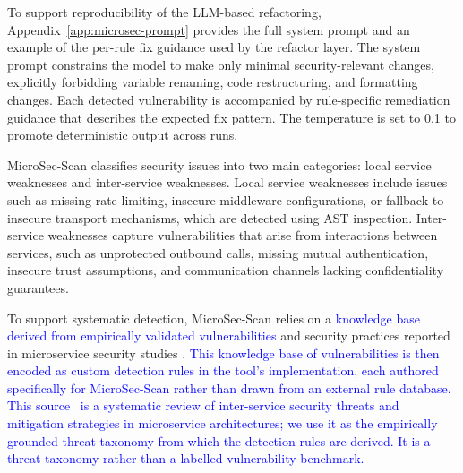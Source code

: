 \documentclass[preprint,12pt]{elsarticle}
\newcommand{\new}[1]{\textcolor{blue}{#1}}
\begin{document}
To support reproducibility of the LLM-based refactoring, Appendix~\ref{app:microsec-prompt} provides the full system prompt and an example of the per-rule fix guidance used by the refactor layer. The system prompt constrains the model to make only minimal security-relevant changes, explicitly forbidding variable renaming, code restructuring, and formatting changes. Each detected vulnerability is accompanied by rule-specific remediation guidance that describes the expected fix pattern. The temperature is set to 0.1 to promote deterministic output across runs.

MicroSec-Scan classifies security issues into two main categories: local service weaknesses and inter-service weaknesses. Local service weaknesses include issues such as missing rate limiting, insecure middleware configurations, or fallback to insecure transport mechanisms, which are detected using AST inspection. Inter-service weaknesses capture vulnerabilities that arise from interactions between services, such as unprotected outbound calls, missing mutual authentication, insecure trust assumptions, and communication channels lacking confidentiality guarantees.

To support systematic detection, MicroSec-Scan relies on a \new{knowledge base derived from empirically validated vulnerabilities} and security practices reported in microservice security studies \cite{haindl2024systematic}. \new{This knowledge base of vulnerabilities is then encoded as custom
detection rules in the tool's implementation, each authored specifically for
MicroSec-Scan rather than drawn from an external rule database.} \new{This source~\cite{haindl2024systematic} is a systematic review of inter-service security threats and mitigation strategies in microservice architectures; we use it as the empirically grounded threat taxonomy from which the detection rules are derived. It is a threat taxonomy rather than a labelled vulnerability benchmark.}
\end{document}
